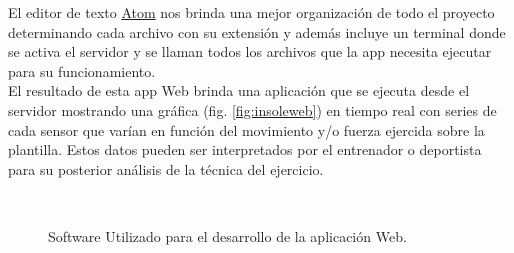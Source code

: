 El editor de texto \href{https://atom.io/}{Atom} nos brinda una mejor organización de todo el proyecto determinando cada archivo con su extensión y además incluye un terminal donde se activa el servidor y se llaman todos los archivos que la app necesita ejecutar para su funcionamiento.\\

El resultado de esta app Web brinda una aplicación que se ejecuta desde el servidor mostrando una gráfica (fig. \ref{fig:insoleweb}) en tiempo real con series de cada sensor que varían en función del movimiento y/o fuerza ejercida sobre la plantilla. Estos datos pueden ser interpretados por el entrenador o deportista para su posterior análisis de la técnica del ejercicio.

\begin{figure}[H]
 \centering
  \\
 \caption{Software Utilizado para el desarrollo de la aplicación Web.}
 \label{fig:appWeb}
\end{figure}


